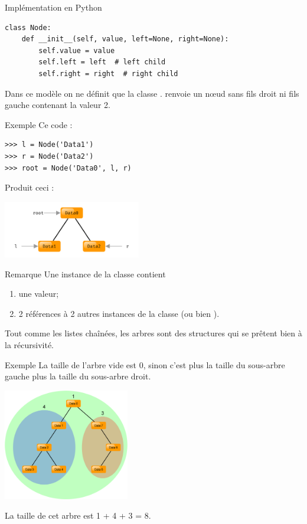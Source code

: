 \documentclass[10pt]{beamer}
\begin{document}
\begin{frame}[fragile]{Implémentation en Python}
\begin{verbatim}
class Node:
    def __init__(self, value, left=None, right=None):
        self.value = value
        self.left = left  # left child
        self.right = right  # right child
\end{verbatim}


\pause
Dans ce modèle on ne définit que la classe .  renvoie un n\oe ud sans fils droit ni fils gauche contenant la valeur 2.
\end{frame}
\begin{frame}[fragile]{Exemple}
Ce code :
\begin{verbatim}
>>> l = Node('Data1')
>>> r = Node('Data2')
>>> root = Node('Data0', l, r)
\end{verbatim}
\pause
Produit ceci : 
    \begin{center}
    \includegraphics[width=6cm]{img/arbre_bin_4}
\end{center}
\end{frame}
\begin{frame}{Remarque}
Une instance de la classe  contient 
\begin{enumerate}[--]
	\item une valeur;
    \item 2 références à 2 autres instances de la classe  (ou bien ).
\end{enumerate}  \pause
Tout comme les listes chaînées, les arbres sont des structures qui se prêtent bien à la récursivité.
\end{frame}
\begin{frame}{Exemple}
    La taille de l'arbre vide est 0, sinon c'est  plus la taille du sous-arbre gauche plus la taille du sous-arbre droit\fg.\pause
    \begin{center}
        \includegraphics[width=5.5cm]{img/taille}
    \end{center}
La taille de cet arbre est 1 + 4 + 3 = 8.
\end{frame}
\end{document}
